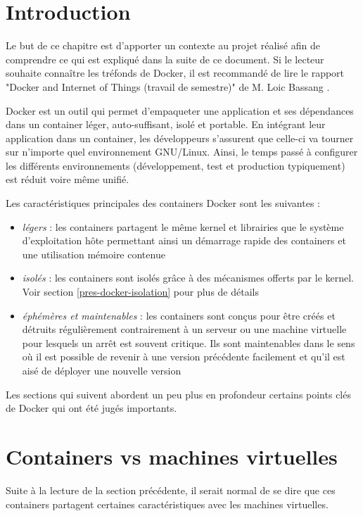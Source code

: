 \newcommand{\bassangPrjSemestre}{Docker and Internet of Things (travail de semestre)}
\newcommand{\bassangPrjBachelor}{Docker and Internet of Things (travail de Bachelor)}
\section{Introduction}

Le but de ce chapitre est d'apporter un contexte au projet réalisé afin de comprendre ce qui est expliqué dans la suite de ce document. Si le lecteur souhaite connaître les tréfonds de Docker, il est recommandé de lire le rapport "\bassangPrjSemestre" de M. Loic Bassang \cite{bassang_semestre}. 

Docker est un outil qui permet d'empaqueter une application et ses dépendances dans un container léger, auto-suffisant, isolé et portable. En intégrant leur application dans un container, les développeurs s'assurent que celle-ci va tourner sur n'importe quel environnement GNU/Linux. Ainsi, le temps passé à configurer les différents environnements (développement, test et production typiquement) est réduit voire même unifié\cite{shipping_container_linux_code}\cite{wikipedia_docker}\cite{what_is_docker}.

Les caractéristiques principales des containers Docker sont les suivantes :
\begin{itemize}
\item \textit{légers} : les containers partagent le même kernel et librairies que le système d'exploitation hôte permettant ainsi un démarrage rapide des containers et une utilisation mémoire contenue
\item \textit{isolés} : les containers sont isolés grâce à des mécanismes offerts par le kernel. Voir section \ref{pres-docker-isolation} pour plus de détails
\item \textit{éphémères et maintenables} : les containers sont conçus pour être créés et détruits régulièrement contrairement à un serveur ou une machine virtuelle pour lesquels un arrêt est souvent critique. Ils sont maintenables dans le sens où il est possible de revenir à une version précédente facilement et qu'il est aisé de déployer une nouvelle version
\end{itemize}

Les sections qui suivent abordent un peu plus en profondeur certains points clés de Docker qui ont été jugés importants.

\section{Containers vs machines virtuelles}
Suite à la lecture de la section précédente, il serait normal de se dire que ces containers partagent certaines caractéristiques avec les machines virtuelles.

